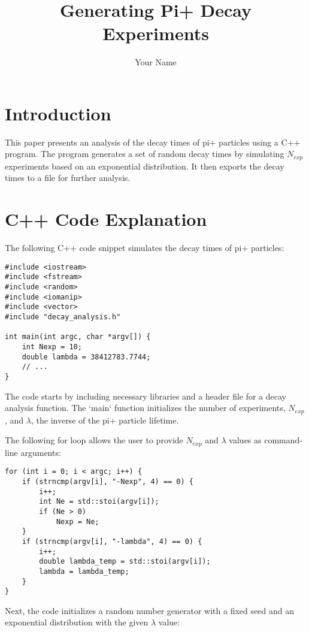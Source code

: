 \documentclass{article}
\begin{document}
\title{Generating Pi+ Decay Experiments}
\author{Your Name}
\date{}
\maketitle

\section{Introduction}

This paper presents an analysis of the decay times of pi+ particles using a C++ program. The program generates a set of random decay times by simulating $N_{exp}$ experiments based on an exponential distribution. It then exports the decay times to a file for further analysis.

\section{C++ Code Explanation}

The following C++ code snippet simulates the decay times of pi+ particles:

\begin{verbatim}
#include <iostream>
#include <fstream>
#include <random>
#include <iomanip>
#include <vector>
#include "decay_analysis.h"

int main(int argc, char *argv[]) {
    int Nexp = 10;
    double lambda = 38412783.7744;
    // ...
}
\end{verbatim}

The code starts by including necessary libraries and a header file for a decay analysis function. The `main` function initializes the number of experiments, $N_{exp}$, and $\lambda$, the inverse of the pi+ particle lifetime.


The following for loop allows the user to provide $N_{exp}$ and $\lambda$ values as command-line arguments:

\begin{verbatim}
for (int i = 0; i < argc; i++) {
    if (strncmp(argv[i], "-Nexp", 4) == 0) {
        i++;
        int Ne = std::stoi(argv[i]);
        if (Ne > 0)
            Nexp = Ne;
    }
    if (strncmp(argv[i], "-lambda", 4) == 0) {
        i++;
        double lambda_temp = std::stoi(argv[i]);
        lambda = lambda_temp;
    }
}
\end{verbatim}

Next, the code initializes a random number generator with a fixed seed and an exponential distribution with the given $\lambda$ value:
\end{document}
